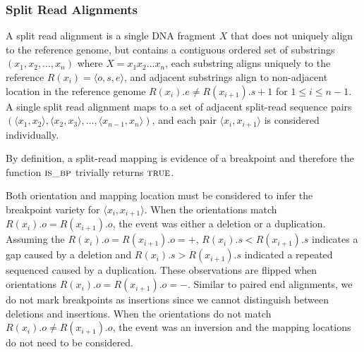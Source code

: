 \documentclass[11pt]{article}
\begin{document}


\subsubsection{Split Read Alignments}

A split read alignment is a single DNA fragment $X$ that does not uniquely align
to the reference genome, but contains a contiguous ordered set of substrings
$(x_1, x_2, \dots, x_n)$ where $X=x_1x_2\dots x_n$, each substring aligns
uniquely to the reference $R(x_i)=\langle o,s,e \rangle$, and adjacent
substrings align to non-adjacent location in the reference genome
$R(x_{i}).e \neq R(x_{i+1}).s + 1$ for $1\leq i \leq n-1$. A single split read
alignment maps to a set of adjacent split-read sequence pairs 
$(\langle x_1 , x_2 \rangle, \langle x_2, x_3 \rangle, \dots ,
\langle x_{n-1},x_n \rangle)$, and each pair $\langle x_i,x_{i+1} \rangle$ is
considered individually.

By definition, a split-read mapping is evidence of a breakpoint and therefore
the function $\textsc{is\_bp}$ trivially returns $\textsc{true}$.

Both orientation and mapping location must be considered to infer the breakpoint
variety for $\langle x_i,x_{i+1} \rangle$.  When the orientations match
$R(x_{i}).o=R(x_{i+1}).o$, the event was either a deletion or
a duplication.  Assuming the $R(x_{i}).o=R(x_{i+1}).o=+$, 
$R(x_{i}).s<R(x_{i+1}).s$ indicates a gap caused by a deletion and 
$R(x_{i}).s>R(x_{i+1}).s$ indicated a repeated sequenced caused by a
duplication.   These observations are flipped when orientations
$R(x_{i}).o=R(x_{i+1}).o=-$.  Similar to paired end alignments, we do not mark
breakpoints as insertions since we cannot distinguish between deletions
and insertions.  When the orientations do not match $R(x_{i}).o \ne
R(x_{i+1}).o$, the event was an inversion and the mapping locations do not need
to be considered.
%
\end{document}
